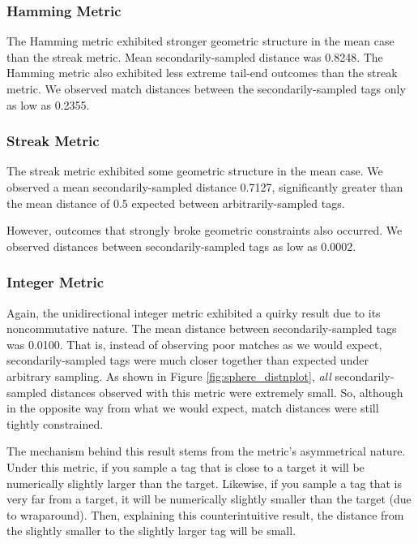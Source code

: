 \subsubsection{Hamming Metric}

The Hamming metric exhibited stronger geometric structure in the mean case than the streak metric.
Mean secondarily-sampled distance was 0.8248.
The Hamming metric also exhibited less extreme tail-end outcomes than the streak metric.
We observed match distances between the secondarily-sampled tags only as low as 0.2355.

\subsubsection{Streak Metric}

The streak metric exhibited some geometric structure in the mean case.
We observed a mean secondarily-sampled distance 0.7127, significantly greater than the mean distance of 0.5 expected between arbitrarily-sampled tags.

However, outcomes that strongly broke geometric constraints also occurred.
We observed distances between secondarily-sampled tags as low as 0.0002.

\subsubsection{Integer Metric}

Again, the unidirectional integer metric exhibited a quirky result due to its noncommutative nature.
The mean distance between secondarily-sampled tags was 0.0100.
That is, instead of observing poor matches as we would expect, secondarily-sampled tags were much closer together than expected under arbitrary sampling.
As shown in Figure \ref{fig:sphere_distnplot}, \textit{all} secondarily-sampled distances observed with this metric were extremely small.
So, although in the opposite way from what we would expect, match distances were still tightly constrained.

The mechanism behind this result stems from the metric's asymmetrical nature.
Under this metric, if you sample a tag that is close to a target it will be numerically slightly larger than the target.
Likewise, if you sample a tag that is very far from a target, it will be numerically slightly smaller than the target (due to wraparound).
Then, explaining this counterintuitive result, the distance from the slightly smaller to the slightly larger tag will be small.

